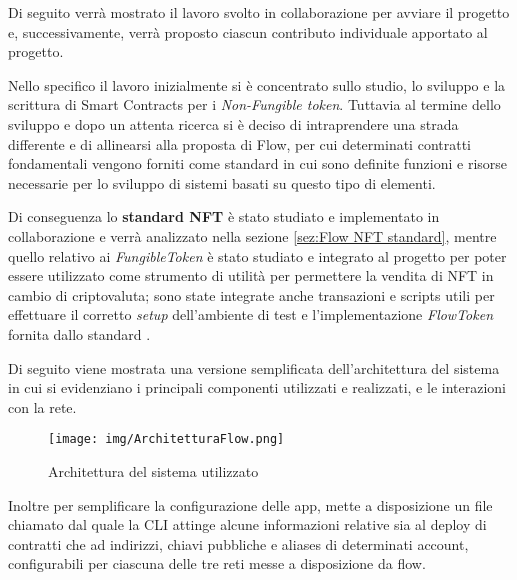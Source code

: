 Di seguito verrà mostrato il lavoro svolto in collaborazione per avviare il progetto e, successivamente, verrà proposto ciascun contributo individuale apportato al progetto.

Nello specifico il lavoro inizialmente si è concentrato sullo studio, lo sviluppo e la scrittura di Smart Contracts per i \textit{Non-Fungible token}. Tuttavia al termine dello sviluppo e dopo un attenta ricerca si è deciso di intraprendere una strada differente e di allinearsi alla proposta di Flow, per cui determinati contratti fondamentali vengono forniti come standard in cui sono definite funzioni e risorse necessarie per lo sviluppo di sistemi basati su questo tipo di elementi. 

Di conseguenza lo \textbf{standard NFT} è stato studiato e implementato in collaborazione e verrà analizzato nella sezione \ref{sez:Flow NFT standard}, mentre quello relativo ai \textit{FungibleToken} è stato studiato e integrato al progetto per poter essere utilizzato come strumento di utilità per permettere la vendita di NFT in cambio di criptovaluta; sono state integrate anche transazioni e scripts utili per effettuare il corretto \textit{setup} dell'ambiente di test e l'implementazione \textit{FlowToken} fornita dallo standard \cite{web:FT-Standard}.

Di seguito viene mostrata una versione semplificata dell'architettura del sistema in cui si evidenziano i principali componenti utilizzati e realizzati, e le interazioni con la rete. 

\begin{figure}[H]
    \centering
    \texttt{[image: img/ArchitetturaFlow.png]}
    \caption{Architettura del sistema utilizzato}
    \label{fig:flowArch}
\end{figure}

Inoltre per semplificare la configurazione delle app, mette a disposizione un file chiamato  dal quale la CLI attinge alcune informazioni relative sia al deploy di contratti che ad indirizzi, chiavi pubbliche e aliases di determinati account, configurabili per ciascuna delle tre reti messe a disposizione da flow.

